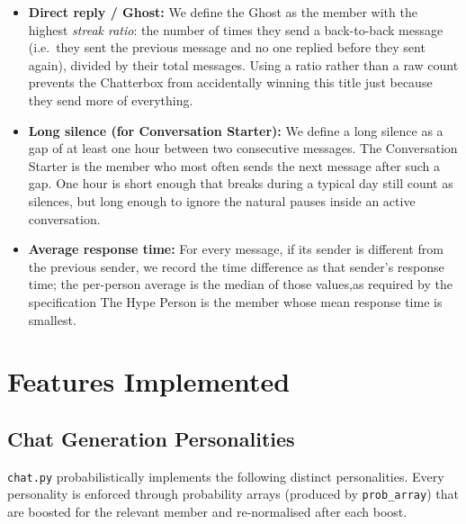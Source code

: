 \documentclass[12pt]{article}
\begin{document}
\begin{itemize}
    \item \textbf{Direct reply / Ghost:} We define the Ghost as the member with
    the highest \emph{streak ratio}: the number of times they send a back-to-back
    message (i.e.\ they sent the previous message and no one replied before
    they sent again), divided by their total messages. Using a ratio rather
    than a raw count prevents the Chatterbox from accidentally winning this
    title just because they send more of everything.

    \item \textbf{Long silence (for Conversation Starter):} We define a long
    silence as a gap of at least one hour between two consecutive messages.
    The Conversation Starter is the member who most often sends the next
    message after such a gap. One hour is short enough that breaks during a
    typical day still count as silences, but long enough to ignore the natural
    pauses inside an active conversation.

    \item \textbf{Average response time:} For every message, if its sender is
    different from the previous sender, we record the time difference as that
    sender's response time; the per-person average is the median of those values,as required by the specification 
    The Hype Person is the member whose mean response time is smallest.
\end{itemize}


\section{Features Implemented}

\subsection{Chat Generation Personalities}

\texttt{chat.py} probabilistically implements the following distinct
personalities. Every personality is enforced through probability arrays
(produced by \texttt{prob\_array}) that are boosted for the relevant member
and re-normalised after each boost.
\end{document}
